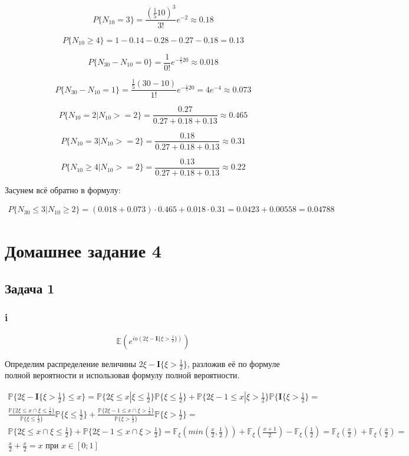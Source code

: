 \documentclass[a4paper,12pt]{article}
\def \mbf{\mathbf}
\def \mbb{\mathbb}
\def \P{\mbb{P}}
\def \E{\mbb{E}}
\def \F{\mbb{F}}
\def \I{\mbf{I}}
\begin{document}
\[ P\{N_{10} = 3 \} = \frac{(\frac{1}{5} 10)^3}{3!} e^{-2}  \approx 0.18\]

\[ P\{N_{10} \ge 4 \} =1 -0.14 -0.28 - 0.27 - 0.18 =0.13 \]



\[ P\{ N_{30} - N_{10} = 0 \} = \frac{1}{0!} e^{-\frac{1}{5}20} \approx 0.018\]

\[ P\{ N_{30} - N_{10} = 1 \} = \frac{\frac{1}{5}(30-10)}{1!} e^{-\frac{1}{5}20} = 4 e^{-4} \approx 0.073\]

\[ P\{ N_{10} = 2 | N_{10} >= 2\} = \frac{0.27}{0.27 + 0.18 + 0.13} \approx 0.465 \]

\[ P\{ N_{10} = 3 | N_{10} >= 2\} = \frac{0.18}{0.27 + 0.18 + 0.13} \approx 0.31 \]

\[ P\{ N_{10} \ge 4 | N_{10} >= 2\} = \frac{0.13}{0.27 + 0.18 + 0.13} \approx 0.22 \]


Засунем всё обратно в формулу:

\begin{equation}
\begin{aligned}
P\{ N_{30} \le 3 | N_{10} \ge 2 \}  = (0.018 + 0.073) \cdot 0.465 + 0.018 \cdot 0.31 = 0.0423 + 0.00558 = 0.04788
\end{aligned}
\end{equation}

\section{Домашнее задание 4}

\subsection{Задача 1}

\subsubsection{i}
\[ \E(e^{iu(2\xi - \I\{ \xi > \frac{1}{2} \})}) \]

Определим распределение величины  $ 2\xi - \I\{ \xi > \frac{1}{2} \}
 $, разложив её по формуле полной вероятности и использовав формулу полной вероятности.
 
\begin{equation}
\begin{aligned}
 \P\{  2\xi - \I\{ \xi > \frac{1}{2}\}  \le x \} = \P\{ 2\xi \le x | \xi \le \frac{1}{2} \}\P\{  \xi \le \frac{1}{2} \}+ \P\{ 2\xi - 1  \le x |  \xi > \frac{1}{2} \} \P\{  \I\{ \xi > \frac{1}{2} \} = \\ \frac{\P\{ 2\xi \le x \cap \xi \le \frac{1}{2} \}}{\P \{ \xi \le \frac{1}{2} \}} \P\{  \xi \le \frac{1}{2} \} +\frac{\P\{ 2\xi - 1 \le x \cap \xi > \frac{1}{2} \}}{\P \{ \xi > \frac{1}{2} \}} \P\{  \xi > \frac{1}{2} \} =\\ \P\{ 2\xi \le x \cap \xi \le \frac{1}{2} \} + \P\{ 2\xi - 1 \le x \cap \xi > \frac{1}{2} \} = \F_\xi(min(\frac{x}{2}, \frac{1}{2})) + \F_\xi(\frac{x + 1}{2}) - \F_\xi(\frac{1}{2}) = \F_\xi(\frac{x}{2}) + \F_\xi(\frac{x}{2}) =\\ \frac{x}{2} + \frac{x}{2} = x \text{ при } x\in[0;1]
\end{aligned}
\end{equation}
\end{document}
